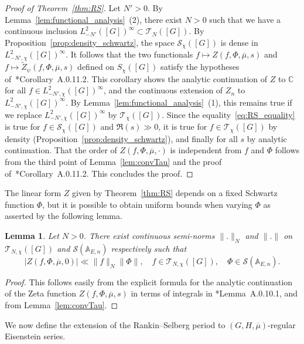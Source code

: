 \documentclass[letterpaper,11pt]{amsart}
\newcommand{\bA}{\mathbb{A}}
\newcommand{\C}{\mathbb{C}}
\newcommand{\cS}{\mathcal{S}}
\newcommand{\cT}{\mathcal{T}}
\newcommand{\<}{\negthickspace}
\providecommand{\aabs}[1]{\lVert#1\rVert}
\newcommand{\valP}[1]{\left|#1\right|}
\theoremstyle{definition}
\theoremstyle{plain}
\newtheorem{lemma}[definition]{Lemma}
\theoremstyle{remark}
\numberwithin{equation}{section}
\begin{document}
\begin{proof}[Proof of Theorem~\ref{thm:RS}]
Let $N'>0$. By Lemma~\ref{lem:functional_analysis}~(2), there exist $N>0$ such that we have a continuous inclusion $L^2_{-N'}([G])^\infty \subset \cT_N([G])$. By Proposition~\ref{prop:density_schwartz}, the space $\cS_\chi([G])$ is dense in $L^2_{-N',\chi}([G])^\infty$. It follows that the two functionals $f \mapsto Z(f,\Phi,
\overline{\mu}, s)$ and $f \mapsto \widetilde{Z}_\psi(f,\Phi, \overline{\mu}, s)$ defined on $S_\chi([G])$ satisfy the hypotheses of~\cite{BPCZ}*{Corollary~A.0.11.2}. This corollary shows the analytic continuation of $Z$ to $\C$ for all $f \in L^2_{-N',\chi}([G])^\infty$, and the continuous extension of $Z_n$ to $L^2_{-N',\chi}([G])^\infty$. By Lemma~\ref{lem:functional_analysis}~(1), this remains true if we replace $L^2_{-N',\chi}([G])^\infty$ by $\cT_\chi([G])$. Since
the equality~\eqref{eq:RS_equality} is true for $f \in \cS_\chi([G])$ and $\Re
(s) \gg 0$, it is true for $f \in \mathcal{T}_\chi([G])$ by density (Proposition~\ref{prop:density_schwartz}), and
finally for all $s$ by analytic continuation. That the order of $Z(f,\Phi,\overline{\mu},\cdot)$ is independent from $f$ and $\Phi$ follows from the third point of Lemma~\ref{lem:convTau} and the proof of~\cite{BPCZ}*{Corollary~A.0.11.2}. This concludes the proof.
\end{proof}

The linear form $Z$ given by Theorem~\ref{thm:RS} depends on a fixed Schwartz function $\Phi$, but it is possible to obtain uniform bounds when varying $\Phi$ as asserted by the following lemma.

\begin{lemma}
\label{lem:Z_continuous_Phi}
    Let $N>0$. There exist continuous semi-norms $\aabs{.}_N$ and $\aabs{.}$ on $\cT_{N,\chi}([G])$ and $\cS(\bA_{E,n})$ respectively such that
    \begin{equation*}
    \valP{Z(f,\Phi,\overline{\mu}, 0)} \ll \aabs{f}_N \aabs{\Phi}, \quad f \in \cT_{N,\chi}([G]), \quad \Phi \in \cS(\bA_{E,n}).
\end{equation*}
\end{lemma}

\begin{proof}
    This follows easily from the explicit formula for the analytic continuation of the Zeta function $Z(f,\Phi,\overline{\mu},s)$ in terms of integrals in \cite{BPCZ}*{Lemma~A.0.10.1}, and from Lemma~\ref{lem:convTau}.
\end{proof}

We now define the extension of the Rankin--Selberg period to $(G,H,\overline{\mu})$-regular Eisenstein series.
\end{document}
